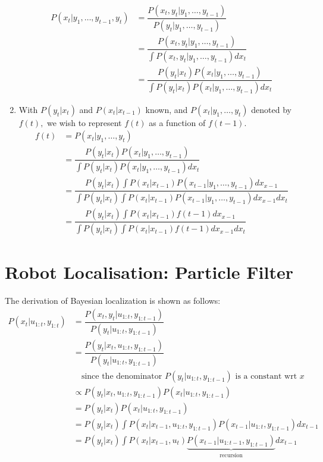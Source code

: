 \documentclass[11pt, a4paper]{article}
\begin{document}
\begin{enumerate}[topsep=0em, itemsep=-1ex, partopsep=1ex, parsep=1ex, label=(\alph*)]
\begin{align*}
P(x_t|y_1, \ldots, y_{t-1}, y_t)&=\dfrac{P(x_t, y_t|y_1, \ldots, y_{t-1})}{P(y_t|y_1, \ldots, y_{t-1})}\\
&=\dfrac{P(x_t, y_t|y_1, \ldots, y_{t-1})}{\int P(x_t, y_t|y_1, \ldots, y_{t-1})dx_t}\\
&=\dfrac{P(y_t|x_t)P(x_t|y_1, \ldots, y_{t-1})}{\int P(y_t|x_t)P(x_t|y_1, \ldots, y_{t-1})dx_t}
\end{align*}
\item With $P(y_t|x_t)$ and $P(x_t|x_{t-1})$ known, and $P(x_t|y_1, \ldots, y_t)$ denoted by $f(t),$ we wish to represent $f(t)$ as a function of $f(t-1).$
\begin{align*}
f(t)&=P(x_t|y_1, \ldots, y_t)\\
&=\dfrac{P(y_t|x_t)P(x_t|y_1, \ldots, y_{t-1})}{\int P(y_t|x_t)P(x_t|y_1, \ldots, y_{t-1})dx_t}\\
&=\dfrac{P(y_t|x_t)\int P(x_t|x_{t-1})P(x_{t-1}|y_1, \ldots, y_{t-1})dx_{x-1}}{\int P(y_t|x_t)\int P(x_t|x_{t-1})P(x_{t-1}|y_1, \ldots, y_{t-1})dx_{x-1}dx_t}\\
&=\dfrac{P(y_t|x_t)\int P(x_t|x_{t-1})f(t-1)dx_{x-1}}{\int P(y_t|x_t)\int P(x_t|x_{t-1})f(t-1)dx_{x-1}dx_t}
\end{align*}
\end{enumerate}

\section{Robot Localisation: Particle Filter}

The derivation of Bayesian localization is shown as follows:
\begin{align*}
P(x_t|u_{1:t}, y_{1:t})&=\dfrac{P(x_t, y_t|u_{1:t}, y_{1:t-1})}{P(y_t|u_{1:t}, y_{1:t-1})}\\
&=\dfrac{P(y_t|x_t, u_{1:t}, y_{1:t-1})}{P(y_t|u_{1:t}, y_{1:t-1})}\\
&\quad\text{since the denominator }P(y_t|u_{1:t}, y_{1:t-1})\text{ is a constant wrt }x\\
&\propto P(y_t|x_t, u_{1:t}, y_{1:t-1})P(x_t|u_{1:t}, y_{1:t-1})\\
&=P(y_t|x_t)P(x_t|u_{1:t}, y_{1:t-1})\\
&=P(y_t|x_t)\int P(x_t|x_{t-1},u_{1:t}, y_{1:t-1})P(x_{t-1}|u_{1:t}, y_{1:t-1})dx_{t-1}\\
&=P(y_t|x_t)\int P(x_t|x_{t-1},u_t)\underbrace{P(x_{t-1}|u_{1:t-1}, y_{1:t-1})}_{\text{recursion}}dx_{t-1}
\end{align*}
\end{document}
